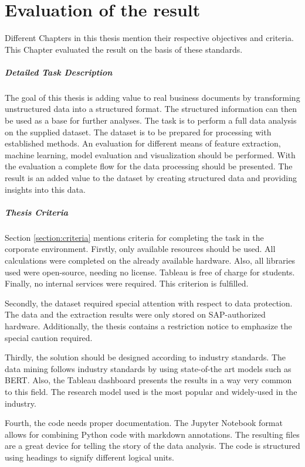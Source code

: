 \chapter{Evaluation of the result}
Different Chapters in this thesis mention their respective objectives and criteria. This Chapter evaluated the result on the basis of these standards.

\paragraph{Detailed Task Description}
The goal of this thesis is adding value to real business documents by transforming unstructured data into a structured format. The structured information can then be used as a base for further analyses.
The task is to perform a full data analysis on the supplied dataset. The dataset is to be prepared for processing with established methods. An evaluation for different means of feature extraction, machine learning, model evaluation and visualization should be performed. With the evaluation a complete flow for the data processing should be presented. The result is an added value to the dataset by creating structured data and providing insights into this data.


\paragraph{Thesis Criteria}
Section \ref{section:criteria} mentions criteria for completing the task in the corporate environment. Firstly, only available resources should be used. All calculations were completed on the already available hardware. Also, all libraries used were open-source, needing no license. Tableau is free of charge for students. Finally, no internal services were required. This criterion is fulfilled.

Secondly, the dataset required special attention with respect to data protection. The data and the extraction results were only stored on SAP-authorized hardware. Additionally, the thesis contains a restriction notice to emphasize the special caution required.

Thirdly, the solution should be designed according to industry standards. The data mining follows industry standards by using state-of-the art models such as \ac{BERT}. Also, the Tableau dashboard presents the results in a way very common to this field. The research model used is the most popular and widely-used in the industry.

Fourth, the code needs proper documentation. The Jupyter Notebook format allows for combining Python code with markdown annotations. The resulting files are a great device for telling the story of the data analysis. The code is structured using headings to signify different logical units.

